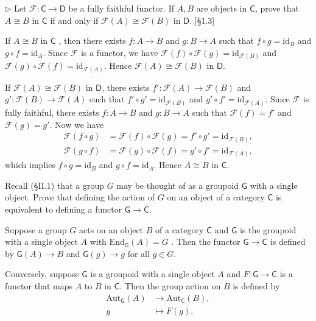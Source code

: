 \begin{problem}[1.2]
$\triangleright$ Let $\mathscr{F}: \mathsf{C} \rightarrow \mathsf{D}$ be a fully faithful functor. If $A, B$ are objects in $\mathsf{C}$, prove that $A \cong B$ in $\mathsf{C}$ if and only if $\mathscr{F}(A) \cong \mathscr{F}(B)$ in $\mathsf{D}$. [\S1.3]
\end{problem}
\begin{solution}
	If  $A \cong B$ in $\mathsf{C}$ , then there exists $f:A\to B$ and $g:B\to A$ such that $f\circ g=\mathrm{id}_B$ and $g\circ f=\mathrm{id}_A$. Since $\mathscr{F}$ is a functor, we have $\mathscr{F}(f)\circ\mathscr{F}(g)=\mathrm{id}_{\mathscr{F}(B)}$
	and $\mathscr{F}(g)\circ\mathscr{F}(f)=\mathrm{id}_{\mathscr{F}(A)}$. Hence  $\mathscr{F}(A) \cong \mathscr{F}(B)$ in $\mathsf{D}$.

	If $\mathscr{F}(A) \cong \mathscr{F}(B)$ in $\mathsf{D}$, there exists $f':\mathscr{F}(A)\to\mathscr{F}(B)$ and $g':\mathscr{F}(B)\to\mathscr{F}(A)$ such that $f'\circ g'=\mathrm{id}_{\mathscr{F}(B)}$ and $g'\circ f'=\mathrm{id}_{\mathscr{F}(A)}$. Since $\mathscr{F}$ is fully faithful, there exists $f:A\to B$ and $g:B\to A$ such that $\mathscr{F}(f)=f'$ and $\mathscr{F}(g)=g'$. Now we have
	\begin{align*}
		\mathscr{F}\left(f\circ g\right)&=\mathscr{F}(f)\circ\mathscr{F}(g)=f'\circ g'=\mathrm{id}_{\mathscr{F}(B)},\\
		\mathscr{F}\left(g\circ f\right)&=\mathscr{F}(g)\circ\mathscr{F}(f)=g'\circ f'=\mathrm{id}_{\mathscr{F}(A)},
	\end{align*}
	which implies $f\circ g=\mathrm{id}_B$ and $g\circ f=\mathrm{id}_A$. Hence $A \cong B$ in $\mathsf{C}$.
\end{solution}


\begin{problem}[1.3]
Recall (\S II.1) that a group $G$ may be thought of as a groupoid $\mathsf{G}$ with a single object. Prove that defining the action of $G$ on an object of a category $\mathsf{C}$ is equivalent to defining a functor $\mathsf{G} \rightarrow \mathsf{C}$.
\end{problem}
\begin{solution}
	Suppose a group $G$ acts on an object $B$ of a category $\mathsf{C}$ and $\mathsf{G}$ is the groupoid with a single object $A$ with $\mathrm{End}_{\mathsf{G}}(A)=G$ . Then the functor $\mathsf{G} \rightarrow \mathsf{C}$ is defined by $\mathsf{G}(A) \rightarrow B$ and $\mathsf{G}(g) \rightarrow g$ for all $g \in G$. 
	
	Conversely, suppose $\mathsf{G}$ is a groupoid with a single object $A$ and $F:\mathsf{G} \rightarrow \mathsf{C}$ is a functor that maps $A$ to $B$ in $\mathsf{C}$. Then the group action on $B$ is defined by 
	\begin{align*}
		\mathrm{Aut}_{\mathsf{G}}(A) &\longrightarrow \mathrm{Aut}_{\mathsf{C}}(B),\\
		g &\longmapsto F(g).
	\end{align*}
\end{solution}

